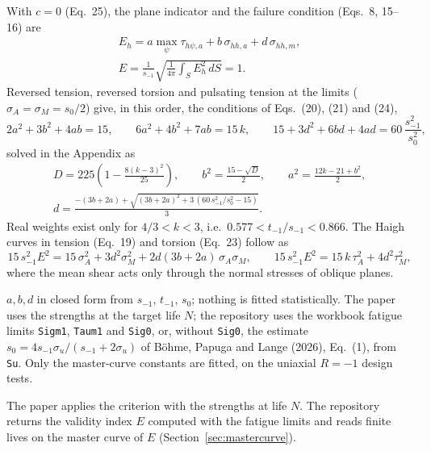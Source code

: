  With $c=0$ (Eq.~25), the plane indicator and the failure condition
(Eqs.~8, 15--16) are
\begin{gather}
E_h=a\max_{\psi}\tau_{h\psi,a}+b\,\sigma_{hh,a}+d\,\sigma_{hh,m},
\label{eq:rfb-eh}\\
E=\frac{1}{s_{-1}}\sqrt{\frac{1}{4\pi}\int_S E_h^2\,dS}=1 .
\label{eq:rfb-main}
\end{gather}
Reversed tension, reversed torsion and pulsating tension at the limits ($\sigma_A=\sigma_M=s_0/2$)
give, in this order, the conditions of Eqs.~(20), (21) and (24),
\begin{equation}
2a^2+3b^2+4ab=15,\qquad 6a^2+4b^2+7ab=15\,k,\qquad 15+3d^2+6bd+4ad=60\,\frac{s_{-1}^2}{s_0^2},
\label{eq:rfb-cal}
\end{equation}
solved in the Appendix as
\begin{gather}
D=225\left(1-\frac{8(k-3)^2}{25}\right),\qquad b^2=\frac{15-\sqrt D}{2},\qquad a^2=\frac{12k-21+b^2}{2},
\label{eq:rfb-ab}\\
d=\frac{-(3b+2a)+\sqrt{(3b+2a)^2+3\,(60\,s_{-1}^2/s_0^2-15)}}{3}.
\label{eq:rfb-d}
\end{gather}
Real weights exist only for $4/3<k<3$, i.e.\ $0.577<t_{-1}/s_{-1}<0.866$. The Haigh curves in tension
(Eq.~19) and torsion (Eq.~23) follow as
\begin{equation}
15\,s_{-1}^2E^2=15\,\sigma_A^2+3d^2\sigma_M^2+2d(3b+2a)\,\sigma_A\sigma_M ,\qquad
15\,s_{-1}^2E^2=15\,k\,\tau_A^2+4d^2\tau_M^2 ,
\label{eq:rfb-haigh}
\end{equation}
where the mean shear acts only through the normal stresses of oblique planes.

 $a,b,d$ in closed form from $s_{-1}$, $t_{-1}$, $s_0$; nothing is
fitted statistically. The paper uses the strengths at the target life $N$; the repository uses the
workbook fatigue limits \texttt{Sigm1}, \texttt{Taum1} and \texttt{Sig0}, or, without
\texttt{Sig0}, the estimate $s_0=4s_{-1}\sigma_u/(s_{-1}+2\sigma_u)$ of B\"ohme, Papuga and Lange
(2026), Eq.~(1), from \texttt{Su}. Only the master-curve constants are fitted, on the uniaxial
$R=-1$ design tests.

 The paper applies the criterion with the strengths at life $N$. The repository returns
the validity index $E$ computed with the fatigue limits and reads finite lives on the master curve
of $E$ (Section~\ref{sec:mastercurve}).

